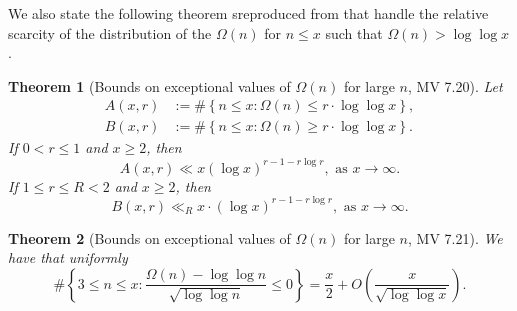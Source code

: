 \documentclass[11pt,reqno,a4letter]{article}
\numberwithin{figure}{section}
\numberwithin{table}{section}
\theoremstyle{plain}
\newtheorem{theorem}{Theorem}
\numberwithin{theorem}{section}
\theoremstyle{definition}
\begin{document}
We also state the following theorem sreproduced from \cite[Thm.\ 7.20]{MV} that handle the relative 
scarcity of the distribution of the $\Omega(n)$ for $n \leq x$ such that 
$\Omega(n) > \log\log x$. 

\begin{theorem}[Bounds on exceptional values of $\Omega(n)$ for large $n$, MV 7.20] 
\label{theorem_MV_Thm7.20-init_stmt} 
Let 
\begin{align*} 
A(x, r) & := \#\left\{n \leq x: \Omega(n) \leq r \cdot \log\log x\right\}, \\ 
B(x, r) & := \#\left\{n \leq x: \Omega(n) \geq r \cdot \log\log x\right\}. 
\end{align*} 
If $0 < r \leq 1$ and $x \geq 2$, then 
\[
A(x, r) \ll x (\log x)^{r-1 - r\log r}, \text{ \ as\ } x \rightarrow \infty. 
\]
If $1 \leq r \leq R < 2$ and $x \geq 2$, then 
\[
B(x, r) \ll_R x \cdot (\log x)^{r-1-r \log r}, \text{ \ as\ } x \rightarrow \infty. 
\]
\end{theorem} 

\begin{theorem}[Bounds on exceptional values of $\Omega(n)$ for large $n$, MV 7.21] 
\label{theorem_MV_Thm7.21-init_stmt} 
We have that uniformly 
\[
\#\left\{3 \leq n \leq x: \frac{\Omega(n) - \log\log n}{\sqrt{\log\log n}} \leq 0\right\} = 
     \frac{x}{2} + O\left(\frac{x}{\sqrt{\log\log x}}\right). 
\]
\end{theorem} 
\end{document}
